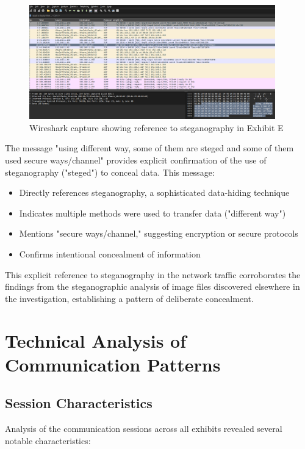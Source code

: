 \begin{figure}[htbp]
    \centering
    \includegraphics[width=0.95\textwidth]{images/Network_Analysis/ExhibitE_pcap_steg.png}
    \caption{Wireshark capture showing reference to steganography in Exhibit E}
    \label{fig:exhibit_e_steg}
\end{figure}

The message "using different way, some of them are steged and some of them used secure ways/channel" provides explicit confirmation of the use of steganography ("steged") to conceal data. This message:

\begin{itemize}
    \item Directly references steganography, a sophisticated data-hiding technique
    \item Indicates multiple methods were used to transfer data ("different way")
    \item Mentions "secure ways/channel," suggesting encryption or secure protocols
    \item Confirms intentional concealment of information
\end{itemize}

This explicit reference to steganography in the network traffic corroborates the findings from the steganographic analysis of image files discovered elsewhere in the investigation, establishing a pattern of deliberate concealment.

\section{Technical Analysis of Communication Patterns}

\subsection{Session Characteristics}
Analysis of the communication sessions across all exhibits revealed several notable characteristics:

